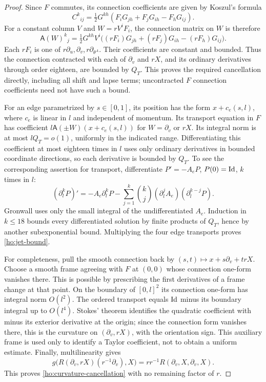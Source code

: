 \begin{proof}
Since $F$ commutes, its connection coefficients are given by Koszul's
formula
\[
 C^k{}_{ij}=\tfrac12G^{kh}
       (F_iG_{jh}+F_jG_{ih}-F_hG_{ij}).
\]
For a constant column $V$ and $W=rV^iF_i$, the connection matrix on
$W$ is therefore
\begin{equation}\label{ho:koszul-scaled}
 \mathsf A(W)^k{}_j
 =\tfrac12G^{kh}V^i
       \bigl((rF_i)G_{jh}+(rF_j)G_{ih}-(rF_h)G_{ij}\bigr).
\end{equation}
Each $rF_i$ is one of $r\partial_u,\partial_v,r\partial_{\theta^A}$.
Their coefficients are constant and bounded.  Thus the connection
contracted with each of $\partial_v$ and $rX$, and its ordinary
derivatives through order eighteen, are bounded by $Q_T$.
This proves the required cancellation directly, including all shift
and lapse terms; uncontracted $F$ connection coefficients need not
have such a bound.

For an edge parametrized by $s\in[0,1]$, its position has the form
$x+c_e(s,l)$, where $c_e$ is linear in $l$ and independent of momentum.
Its transport equation in $F$ has coefficient
$l\mathsf A(\pm W)(x+c_e(s,l))$ for $W=\partial_v$ or $rX$.
Its integral norm is at most $lQ_T=o(1)$, uniformly in the indicated
range.  Differentiating this coefficient at most eighteen times in
$l$ uses only ordinary derivatives in bounded coordinate directions,
so each derivative is bounded by $Q_T$.
To see the corresponding assertion for transport, differentiate
$P'=-A_eP$, $P(0)=\mathrm{Id}$, $k$ times in $l$:
\[
 (\partial_l^kP)'=-A_e\partial_l^kP
       -\sum_{j=1}^k\binom{k}{j}
            (\partial_l^jA_e)(\partial_l^{k-j}P).
\]
Gronwall uses only the small integral of the undifferentiated $A_e$.
Induction in $k\le18$ bounds every differentiated solution by finite
products of $Q_T$, hence by another subexponential bound.  Multiplying
the four edge transports proves \eqref{ho:jet-bound}.

For completeness, pull the smooth connection back by
$(s,t)\mapsto x+s\partial_v+trX$.  Choose a smooth frame agreeing
with $F$ at $(0,0)$ whose connection one-form vanishes there.
This is possible by prescribing the first derivatives of a frame
change at that point.  On the boundary of $[0,l]^2$ its connection
one-form has integral norm $O(l^2)$.  The ordered transport equals
$\mathrm{Id}$ minus its boundary integral up to $O(l^4)$.  Stokes' theorem
identifies the quadratic coefficient with minus its exterior
derivative at the origin; since the connection form vanishes there,
this is the curvature on $(\partial_v,rX)$, with the orientation sign.
This auxiliary frame is used only to identify a Taylor coefficient,
not to obtain a uniform estimate.
Finally, multilinearity gives
\[
 g\bigl(R(\partial_v,rX)(r^{-1}\partial_v),X\bigr)
       =r r^{-1}R(\partial_v,X,\partial_v,X).
\]
This proves \eqref{ho:curvature-cancellation} with no remaining
factor of $r$.
\end{proof}

